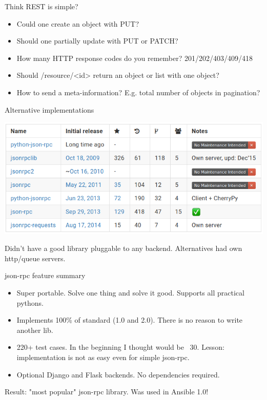 \documentclass[unicode, notheorems, aspectratio=169]{beamer}
\begin{document}
\begin{frame}{Think REST is simple?}
\begin{itemize}
\item Could one create an object with PUT?
\item Should one partially update with PUT or PATCH?
\item How many HTTP response codes do you remember? 201/202/403/409/418\footnotemark
\item Should /resource/<id> return an object or list with one object?
\item How to send a meta-information? E.g. total number of objects in pagination?
\end{itemize}

\end{frame}

\begin{frame}{Alternative implementations}
\begin{center}
	\includegraphics[width=.95\paperwidth]{./images/alternatives} 
\end{center}

{\small
Didn't have a good library pluggable to any backend. Alternatives had own http/queue servers.
}
\end{frame}

\begin{frame}{json-rpc feature summary}
\begin{itemize}
\item Super portable. Solve one thing and solve it good. Supports all practical pythons.
\item Implements 100\% of standard (1.0 and 2.0). There is no reason to write another lib.
\item 220+ test cases. In the beginning I thought would be ~30. Lesson: implementation is not as easy even for simple json-rpc.
\item Optional Django and Flask backends. No dependencies required.
\end{itemize}

Result: "most popular" json-rpc library. Was used in Ansible 1.0!
\end{frame}
\end{document}
